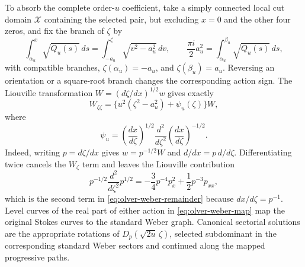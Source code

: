 \documentclass[11pt]{article}
\theoremstyle{remark}
\begin{document}
To absorb the complete order-\(u\)
coefficient, take a simply connected local cut domain \(\mathcal X\)
containing the selected pair, but excluding \(x=0\) and the other four
zeros, and fix the branch of \(\zeta\) by
\begin{equation}
 \int_{\alpha_u}^{x}\sqrt{Q_u(s)}\,ds
 =\int_{-a_u}^{\zeta}\sqrt{v^2-a_u^2}\,dv,
 \qquad
 \frac{\pi i}{2}a_u^2=\int_{\alpha_u}^{\beta_u}\sqrt{Q_u(s)}\,ds,
 \label{eq:olver-weber-map}
\end{equation}
with compatible branches, \(\zeta(\alpha_u)=-a_u\), and
\(\zeta(\beta_u)=a_u\).  Reversing an orientation or a square-root branch
changes the corresponding action sign.  The Liouville transformation
\(W=(d\zeta/dx)^{1/2}w\) gives exactly
\begin{equation}
 W_{\zeta\zeta}=\{u^2(\zeta^2-a_u^2)+\psi_u(\zeta)\}W,
 \label{eq:olver-weber-transformed}
\end{equation}
where
\begin{equation}
 \psi_u=\left(\frac{dx}{d\zeta}\right)^{1/2}
 \frac{d^2}{d\zeta^2}\left(\frac{dx}{d\zeta}\right)^{-1/2}.
 \label{eq:olver-weber-remainder}
\end{equation}
Indeed, writing \(p=d\zeta/dx\) gives \(w=p^{-1/2}W\) and
\(d/dx=p\,d/d\zeta\).  Differentiating twice cancels the
\(W_\zeta\) term and leaves the Liouville contribution
\begin{equation}
 p^{-1/2}\frac{d^2}{d\zeta^2}p^{1/2}
 =-\frac34p^{-4}p_x^2+\frac12p^{-3}p_{xx},
 \label{eq:olver-liouville-identity}
\end{equation}
which is the second term in \eqref{eq:olver-weber-remainder} because
\(dx/d\zeta=p^{-1}\).
Level curves of the real part of either action in
\eqref{eq:olver-weber-map} map the original Stokes curves to the standard
Weber graph.  Canonical sectorial solutions are the appropriate rotations of
\(D_p(\sqrt{2u}\,\zeta)\), selected subdominant in the corresponding standard
Weber sectors and continued along the mapped progressive paths.
\end{document}
